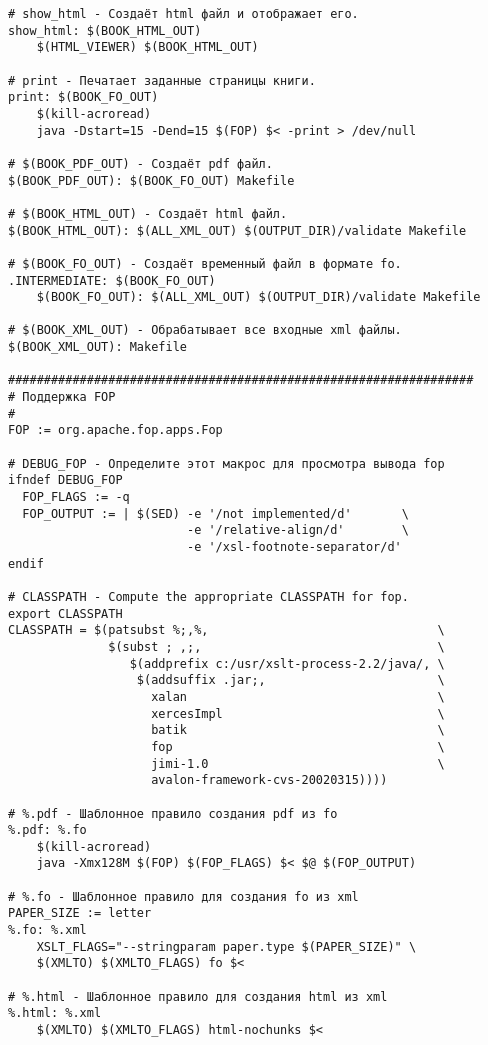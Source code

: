 {\begin{verbatim}
# show_html - Создаёт html файл и отображает его.
show_html: $(BOOK_HTML_OUT)
    $(HTML_VIEWER) $(BOOK_HTML_OUT)

# print - Печатает заданные страницы книги.
print: $(BOOK_FO_OUT)
    $(kill-acroread)
    java -Dstart=15 -Dend=15 $(FOP) $< -print > /dev/null

# $(BOOK_PDF_OUT) - Создаёт pdf файл.
$(BOOK_PDF_OUT): $(BOOK_FO_OUT) Makefile

# $(BOOK_HTML_OUT) - Создаёт html файл.
$(BOOK_HTML_OUT): $(ALL_XML_OUT) $(OUTPUT_DIR)/validate Makefile

# $(BOOK_FO_OUT) - Создаёт временный файл в формате fo.
.INTERMEDIATE: $(BOOK_FO_OUT)
    $(BOOK_FO_OUT): $(ALL_XML_OUT) $(OUTPUT_DIR)/validate Makefile

# $(BOOK_XML_OUT) - Обрабатывает все входные xml файлы.
$(BOOK_XML_OUT): Makefile

#################################################################
# Поддержка FOP
#
FOP := org.apache.fop.apps.Fop

# DEBUG_FOP - Определите этот макрос для просмотра вывода fop
ifndef DEBUG_FOP
  FOP_FLAGS := -q
  FOP_OUTPUT := | $(SED) -e '/not implemented/d'       \
                         -e '/relative-align/d'        \
                         -e '/xsl-footnote-separator/d'
endif

# CLASSPATH - Compute the appropriate CLASSPATH for fop.
export CLASSPATH
CLASSPATH = $(patsubst %;,%,                                \
              $(subst ; ,;,                                 \
                 $(addprefix c:/usr/xslt-process-2.2/java/, \
                  $(addsuffix .jar;,                        \
                    xalan                                   \
                    xercesImpl                              \
                    batik                                   \
                    fop                                     \
                    jimi-1.0                                \
                    avalon-framework-cvs-20020315))))

# %.pdf - Шаблонное правило создания pdf из fo
%.pdf: %.fo
    $(kill-acroread)
    java -Xmx128M $(FOP) $(FOP_FLAGS) $< $@ $(FOP_OUTPUT)

# %.fo - Шаблонное правило для создания fo из xml
PAPER_SIZE := letter
%.fo: %.xml
    XSLT_FLAGS="--stringparam paper.type $(PAPER_SIZE)" \
    $(XMLTO) $(XMLTO_FLAGS) fo $<

# %.html - Шаблонное правило для создания html из xml
%.html: %.xml
    $(XMLTO) $(XMLTO_FLAGS) html-nochunks $<


\end{verbatim}}
